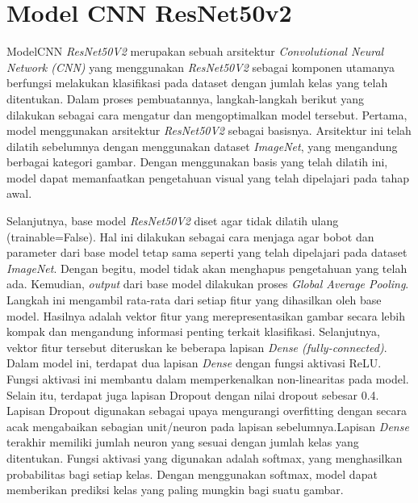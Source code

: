 \section{Model CNN ResNet50v2}
ModelCNN \textit{ResNet50V2} merupakan sebuah arsitektur \textit{Convolutional Neural Network (CNN)} yang menggunakan \textit{ResNet50V2} sebagai komponen utamanya berfungsi melakukan klasifikasi pada dataset dengan jumlah kelas yang telah ditentukan. Dalam proses pembuatannya, langkah-langkah berikut yang dilakukan sebagai cara mengatur dan mengoptimalkan model tersebut. Pertama, model menggunakan arsitektur \textit{ResNet50V2} sebagai basisnya. Arsitektur ini telah dilatih sebelumnya dengan menggunakan dataset \textit{ImageNet}, yang mengandung berbagai kategori gambar. Dengan menggunakan basis yang telah dilatih ini, model dapat memanfaatkan pengetahuan visual yang telah dipelajari pada tahap awal.

Selanjutnya, base model \textit{ResNet50V2} diset agar tidak dilatih ulang (trainable=False). Hal ini dilakukan sebagai cara menjaga agar bobot dan parameter dari base model tetap sama seperti yang telah dipelajari pada dataset \textit{ImageNet}. Dengan begitu, model tidak akan menghapus pengetahuan yang telah ada. Kemudian, \textit{output} dari base model dilakukan proses \textit{Global Average Pooling}. Langkah ini mengambil rata-rata dari setiap fitur yang dihasilkan oleh base model. Hasilnya adalah vektor fitur yang merepresentasikan gambar secara lebih kompak dan mengandung informasi penting terkait klasifikasi. Selanjutnya, vektor fitur tersebut diteruskan ke beberapa lapisan\textit{ Dense (fully-connected)}. Dalam model ini, terdapat dua lapisan\textit{ Dense} dengan fungsi aktivasi ReLU. Fungsi aktivasi ini membantu dalam memperkenalkan non-linearitas pada model. Selain itu, terdapat juga lapisan Dropout dengan nilai dropout sebesar 0.4. Lapisan Dropout digunakan sebagai upaya mengurangi overfitting dengan secara acak mengabaikan sebagian unit/neuron pada lapisan sebelumnya.Lapisan\textit{ Dense} terakhir memiliki jumlah neuron yang sesuai dengan jumlah kelas yang ditentukan. Fungsi aktivasi yang digunakan adalah softmax, yang menghasilkan probabilitas bagi setiap kelas. Dengan menggunakan softmax, model dapat memberikan prediksi kelas yang paling mungkin bagi suatu gambar.

